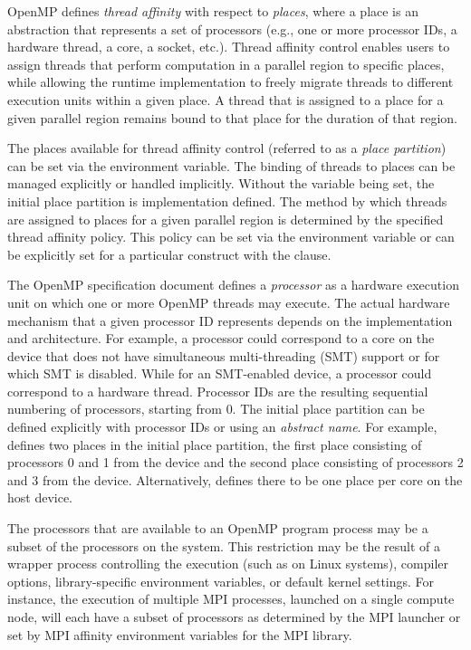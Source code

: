 \label{chap:openmp_affinity}

OpenMP defines \emph{thread affinity} with respect to \emph{places}, where a
place is an abstraction that represents a set of processors (e.g., one or more
processor IDs, a hardware thread, a core, a socket, etc.). Thread affinity
control enables users to assign threads that perform computation in a parallel
region to specific places, while allowing the runtime implementation to freely
migrate threads to different execution units within a given place. A thread
that is assigned to a place for a given parallel region remains bound to that
place for the duration of that region.

The places available for thread affinity control (referred to as a \emph{place
partition}) can be set via the  environment variable. The
binding of threads to places can be managed explicitly or handled implicitly.
Without the  variable being set, the initial place partition
is implementation defined.  The method by which threads are assigned to places
for a given parallel region is determined by the specified thread affinity
policy. This policy can be set via the  environment
variable or can be explicitly set for a particular  construct
with the  clause.

The OpenMP specification document defines a \emph{processor} as a hardware
execution unit on which one or more OpenMP threads may execute. The actual
hardware mechanism that a given processor ID represents depends on the
implementation and architecture. For example, a processor could correspond to a
core on the device that does not have simultaneous multi-threading (SMT)
support or for which SMT is disabled. While for an SMT-enabled device, a
processor could correspond to a hardware thread. Processor IDs are the
resulting sequential numbering of processors, starting from 0. The initial
place partition can be defined explicitly with processor IDs or using an
\emph{abstract name}. For example, 
defines two places in the initial place partition, the first place consisting
of processors 0 and 1 from the device and the second place consisting of
processors 2 and 3 from the device. Alternatively, 
defines there to be one place per core on the host device.

The processors that are available to an OpenMP program process may be a subset
of the processors on the system. This restriction may be the result of a
wrapper process controlling the execution (such as  on Linux
systems), compiler options, library-specific environment variables, or default
kernel settings. For instance, the execution of multiple MPI processes, launched
on a single compute node, will each have a subset of processors as determined
by the MPI launcher or set by MPI affinity environment variables for the MPI
library.

